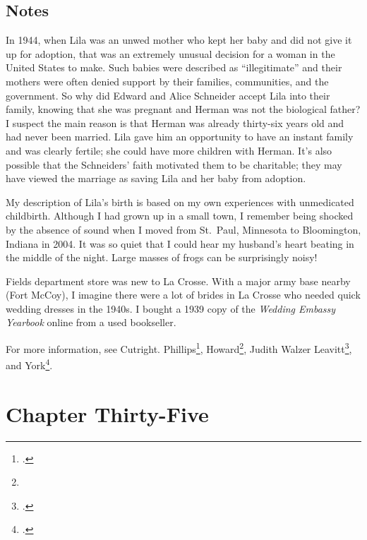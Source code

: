 \documentclass[
  letterpaper,
]{book}
\begin{document}
\section{Notes}\label{notes-36}

In 1944, when Lila was an unwed mother who kept her baby and did not
give it up for adoption, that was an extremely unusual decision for a
woman in the United States to make. Such babies were described as
``illegitimate'' and their mothers were often denied support by their
families, communities, and the government. So why did Edward and Alice
Schneider accept Lila into their family, knowing that she was pregnant
and Herman was not the biological father? I suspect the main reason is
that Herman was already thirty-six years old and had never been married.
Lila gave him an opportunity to have an instant family and was clearly
fertile; she could have more children with Herman. It's also possible
that the Schneiders' faith motivated them to be charitable; they may
have viewed the marriage as saving Lila and her baby from adoption.

My description of Lila's birth is based on my own experiences with
unmedicated childbirth. Although I had grown up in a small town, I
remember being shocked by the absence of sound when I moved from
St.~Paul, Minnesota to Bloomington, Indiana in 2004. It was so quiet
that I could hear my husband's heart beating in the middle of the night.
Large masses of frogs can be surprisingly noisy!

Fields department store was new to La Crosse. With a major army base
nearby (Fort McCoy), I imagine there were a lot of brides in La Crosse
who needed quick wedding dresses in the 1940s. I bought a 1939 copy of
the \emph{Wedding Embassy Yearbook} online from a used bookseller.

For more information, see Cutright. Phillips\footnote{.}, Howard\footnote{}, Judith Walzer Leavitt\footnote{.}, and York\footnote{.}.


\chapter{Chapter Thirty-Five}\label{chapter-thirty-five}
\end{document}
